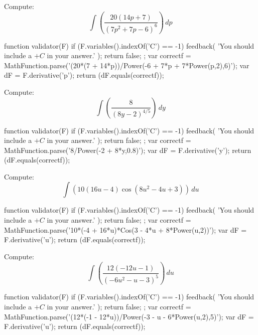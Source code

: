 \documentclass{ximera}
\renewcommand{\d}{\, d}
\begin{document}
\begin{exercise}
Compute: 
\[
\int \left(\frac{20 (14 p+7)}{\left(7 p^2+7 p-6\right)^6}\right)\d p
\]
\begin{expressionAnswer}
     function validator(F) {
      if (F.variables().indexOf('C') == -1) {
        feedback( 'You should include a $+C$ in your answer.' );
        return false;
      };      
      var correctf = MathFunction.parse('(20*(7 + 14*p))/Power(-6 + 7*p + 7*Power(p,2),6)');
      var dF = F.derivative('p');
      return (dF.equals(correctf));
    }
\end{expressionAnswer}
\end{exercise}



\begin{exercise}
Compute: 
\[
\int \left(\frac{8}{(8 y-2)^{4/5}}\right)\d y
\]
\begin{expressionAnswer}
     function validator(F) {
      if (F.variables().indexOf('C') == -1) {
        feedback( 'You should include a $+C$ in your answer.' );
        return false;
      };      
      var correctf = MathFunction.parse('8/Power(-2 + 8*y,0.8)');
      var dF = F.derivative('y');
      return (dF.equals(correctf));
    }
\end{expressionAnswer}
\end{exercise}



\begin{exercise}
Compute: 
\[
\int \left(10 (16 u-4) \cos \left(8 u^2-4 u+3\right)\right)\d u
\]
\begin{expressionAnswer}
     function validator(F) {
      if (F.variables().indexOf('C') == -1) {
        feedback( 'You should include a $+C$ in your answer.' );
        return false;
      };      
      var correctf = MathFunction.parse('10*(-4 + 16*u)*Cos(3 - 4*u + 8*Power(u,2))');
      var dF = F.derivative('u');
      return (dF.equals(correctf));
    }
\end{expressionAnswer}
\end{exercise}



\begin{exercise}
Compute: 
\[
\int \left(\frac{12 (-12 u-1)}{\left(-6 u^2-u-3\right)^5}\right)\d u
\]
\begin{expressionAnswer}
     function validator(F) {
      if (F.variables().indexOf('C') == -1) {
        feedback( 'You should include a $+C$ in your answer.' );
        return false;
      };      
      var correctf = MathFunction.parse('(12*(-1 - 12*u))/Power(-3 - u - 6*Power(u,2),5)');
      var dF = F.derivative('u');
      return (dF.equals(correctf));
    }
\end{expressionAnswer}
\end{exercise}
\end{document}
